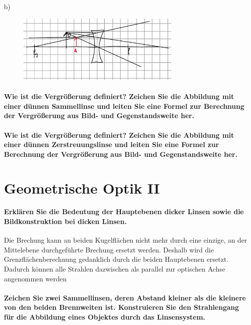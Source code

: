 \documentclass[a4paper, 11pt, ngerman, parskip=half-]{scrartcl}
\begin{document}
b)
\begin{figure}[H]
    \centering
    \includegraphics[width=8cm]{image/17/geo16b}
\end{figure}








\paragraph{Wie ist die Vergrößerung definiert? Zeichen Sie die Abbildung mit einer dünnen
    Sammellinse und leiten Sie eine Formel zur Berechnung der Vergrößerung aus Bild- und
    Gegenstandsweite her.}

\paragraph{Wie ist die Vergrößerung definiert? Zeichen Sie die Abbildung mit einer dünnen
    Zerstreuungslinse und leiten Sie eine Formel zur Berechnung der Vergrößerung aus Bild- und
    Gegenstandsweite her.}

\newpage

\section{Geometrische Optik II}

\paragraph{Erklären Sie die Bedeutung der Hauptebenen dicker Linsen sowie die Bildkonstruktion bei
    dicken Linsen.}

Die Brechung kann an beiden Kugelflächen nicht mehr durch eine einzige, an der Mittelebene durchgeführte Brechung ersetzt werden. Deshalb wird die Grenzflächenberechnung gedanklich durch die beiden Hauptebenen ersetzt. Dadurch können alle Strahlen dazwischen als parallel zur optischen Achse angenommen werden

\paragraph{Zeichen Sie zwei Sammellinsen, deren Abstand kleiner als die kleinere von den beiden
    Brennweiten ist. Konstruieren Sie den Strahlengang für die Abbildung eines Objektes durch
    das Linsensystem.}
\end{document}
